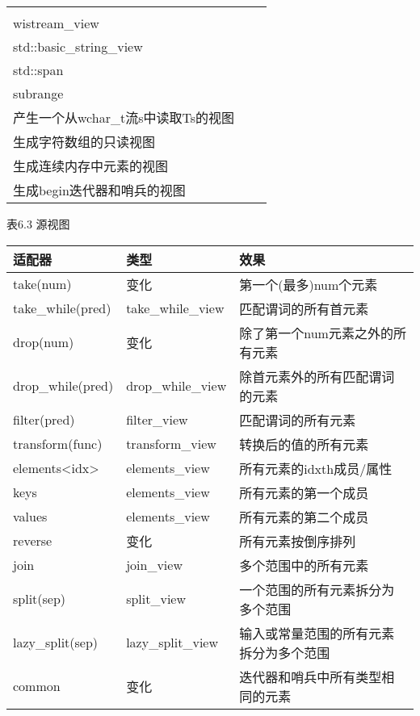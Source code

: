 \begin{longtable}[c]{|l|l|l|}
\begin{tabular}[c]{@{}l@{}}istream\_view\\ wistream\_view\\ std::basic\_string\_view\\ std::span\\ subrange\end{tabular} &
\begin{tabular}[c]{@{}l@{}}产生从字符流s读取Ts的视图\\ 产生一个从wchar\_t流s中读取Ts的视图\\ 生成字符数组的只读视图\\ 生成连续内存中元素的视图\\ 生成begin迭代器和哨兵的视图\end{tabular} \\ \hline
\end{longtable}

\begin{center}
表6.3 源视图
\end{center}

\begin{longtable}[c]{|l|l|l|}
\hline
\textbf{适配器} & \textbf{类型}   & \textbf{效果}                                       \\ \hline
\endfirsthead
%
\endhead
%
take(num)        & 变化          & 第一个(最多)num个元素                         \\ \hline
take\_while(pred)                    & take\_while\_view & 匹配谓词的所有首元素                        \\ \hline
drop(num)        & 变化          & 除了第一个num元素之外的所有元素                     \\ \hline
drop\_while(pred)                    & drop\_while\_view & 除首元素外的所有匹配谓词的元素                 \\ \hline
filter(pred)     & filter\_view    & 匹配谓词的所有元素                  \\ \hline
transform(func)  & transform\_view & 转换后的值的所有元素                \\ \hline
elements\textless{}idx\textgreater{} & elements\_view    & 所有元素的idxth成员/属性                         \\ \hline
keys             & elements\_view  & 所有元素的第一个成员                      \\ \hline
values           & elements\_view  & 所有元素的第二个成员                     \\ \hline
reverse          & 变化          & 所有元素按倒序排列                         \\ \hline
join             & join\_view      & 多个范围中的所有元素            \\ \hline
split(sep)       & split\_view     & 一个范围的所有元素拆分为多个范围    \\ \hline
lazy\_split(sep)                     & lazy\_split\_view & 输入或常量范围的所有元素拆分为多个范围 \\ \hline
common           & 变化          & 迭代器和哨兵中所有类型相同的元素 \\ \hline
\end{longtable}

